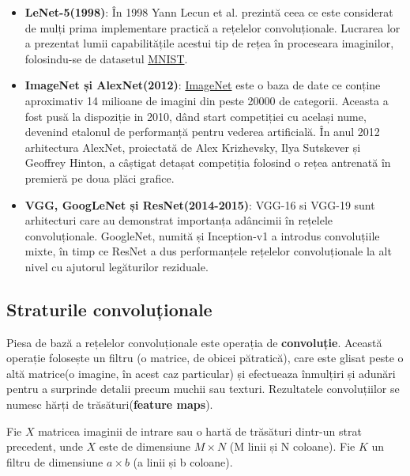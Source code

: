 \begin{itemize}
    \item \textbf{LeNet-5(1998)}\cite{lecun1998gradient}: În 1998 Yann Lecun et al. prezintă ceea ce este considerat de mulți prima implementare practică a rețelelor convoluționale. Lucrarea lor a prezentat lumii capabilitățile acestui tip de rețea în proceseara imaginilor, folosindu-se de datasetul \href{https://en.wikipedia.org/wiki/MNIST_database}{MNIST}.

    \item \textbf{ImageNet și AlexNet(2012)}\cite{krizhevsky2012imagenet}: \href{https://en.wikipedia.org/wiki/ImageNet}{ImageNet} este o baza de date ce conține aproximativ 14 milioane de imagini din peste 20000 de categorii. Aceasta a fost pusă la dispoziție in 2010, dând start competiției cu același nume, devenind etalonul de performanță pentru vederea artificială. În anul 2012 arhitectura AlexNet, proiectată de Alex Krizhevsky, Ilya Sutskever și Geoffrey Hinton, a câștigat detașat competiția folosind o rețea antrenată în premieră pe doua plăci grafice. 

    \item \textbf{VGG, GoogLeNet și ResNet(2014-2015)}\cite{simonyan2014very, szegedy2015going, he2016deep}: VGG-16 si VGG-19 sunt arhitecturi care au demonstrat importanța adâncimii în rețelele convoluționale. GoogleNet, numită și Inception-v1 a introdus convoluțiile mixte, în timp ce ResNet a dus performanțele rețelelor convoluționale la alt nivel cu ajutorul legăturilor reziduale.
\end{itemize}

\subsection{Straturile convoluționale}

Piesa de bază a rețelelor convoluționale este operația de \textbf{convoluție}. Această operație folosește un filtru (o matrice, de obicei pătratică), care este glisat peste o altă matrice(o imagine, în acest caz particular) și efectueaza înmulțiri și adunări pentru a surprinde detalii precum muchii sau texturi. Rezultatele convoluțiilor se numesc hărți de trăsături(\textbf{feature maps}). 

Fie \(X\) matricea imaginii de intrare sau o hartă de trăsături dintr-un strat precedent, unde \(X\) este de dimensiune \(M \times N\) (M linii și N coloane).
Fie \(K\) un filtru de dimensiune \(a \times b\) (a linii și b coloane).

